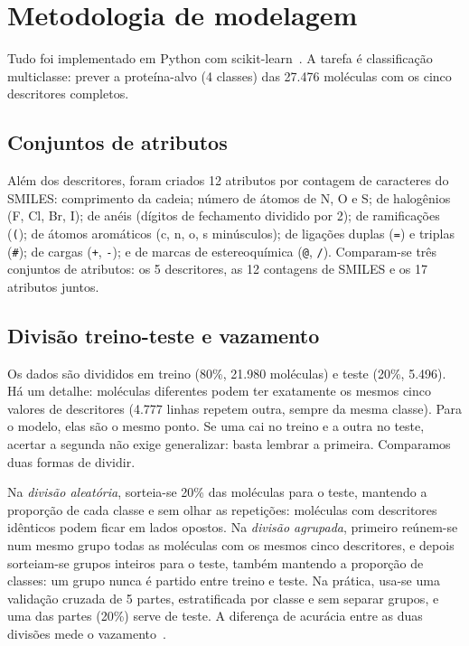 \section{Metodologia de modelagem}\label{sec:metodologia}

Tudo foi implementado em Python com scikit-learn~\cite{pedregosa:11}. A tarefa é classificação multiclasse: prever a proteína-alvo (4 classes) das 27.476 moléculas com os cinco descritores completos.

\subsection{Conjuntos de atributos}

Além dos descritores, foram criados 12 atributos por contagem de caracteres do SMILES: comprimento da cadeia; número de átomos de N, O e S; de halogênios (F, Cl, Br, I); de anéis (dígitos de fechamento dividido por 2); de ramificações (\texttt{(}); de átomos aromáticos (c, n, o, s minúsculos); de ligações duplas (\texttt{=}) e triplas (\texttt{\#}); de cargas (\texttt{+}, \texttt{-}); e de marcas de estereoquímica (\texttt{@}, \texttt{/}). Comparam-se três conjuntos de atributos: os 5 descritores, as 12 contagens de SMILES e os 17 atributos juntos.

\subsection{Divisão treino-teste e vazamento}\label{sec:splits}

Os dados são divididos em treino (80\%, 21.980 moléculas) e teste (20\%, 5.496). Há um detalhe: moléculas diferentes podem ter exatamente os mesmos cinco valores de descritores (4.777 linhas repetem outra, sempre da mesma classe). Para o modelo, elas são o mesmo ponto. Se uma cai no treino e a outra no teste, acertar a segunda não exige generalizar: basta lembrar a primeira. Comparamos duas formas de dividir.

Na \emph{divisão aleatória}, sorteia-se 20\% das moléculas para o teste, mantendo a proporção de cada classe e sem olhar as repetições: moléculas com descritores idênticos podem ficar em lados opostos. Na \emph{divisão agrupada}, primeiro reúnem-se num mesmo grupo todas as moléculas com os mesmos cinco descritores, e depois sorteiam-se grupos inteiros para o teste, também mantendo a proporção de classes: um grupo nunca é partido entre treino e teste. Na prática, usa-se uma validação cruzada de 5 partes, estratificada por classe e sem separar grupos, e uma das partes (20\%) serve de teste. A diferença de acurácia entre as duas divisões mede o vazamento~\cite{kapoor:23}.

